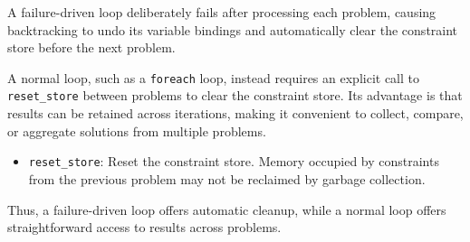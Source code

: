 A failure-driven loop deliberately fails after processing each problem, causing backtracking to undo its variable bindings and automatically clear the constraint store before the next problem. 

A normal loop, such as a \texttt{foreach} loop, instead requires an explicit call to \texttt{reset\_store} between problems to clear the constraint store. Its advantage is that results can be retained across iterations, making it convenient to collect, compare, or aggregate solutions from multiple problems. 

\begin{itemize}
\item \texttt{reset\_store}: Reset the constraint store. Memory occupied by constraints from the previous problem may not be reclaimed by garbage collection.
\end{itemize}

Thus, a failure-driven loop offers automatic cleanup, while a normal loop offers straightforward access to results across problems.
